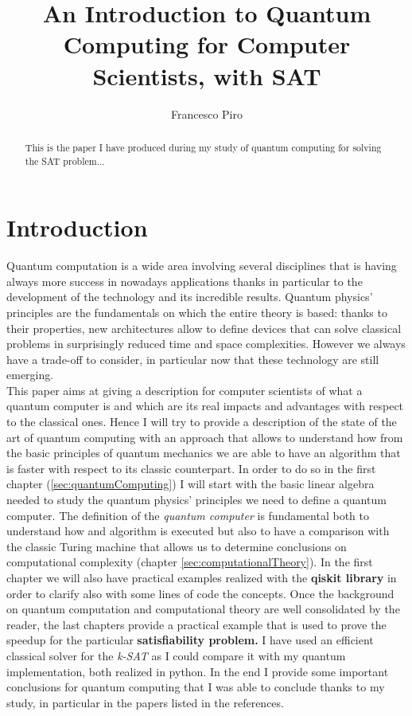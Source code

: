\documentclass[english]{article}
\begin{document}
	\title{An Introduction to Quantum Computing for Computer Scientists, with SAT}
	\author{Francesco Piro}
	\maketitle
	
	\begin{abstract}
		This is the paper I have produced during my study of quantum computing for solving the SAT problem...
	\end{abstract}

	
	\section*{Introduction}
	\label{sec:introduction}
	Quantum computation is a wide area involving several disciplines that is having always more success in nowadays applications thanks in particular to the development of the technology and its incredible results. Quantum physics' principles are the fundamentals on which the entire theory is based: thanks to their properties, new architectures allow to define devices that can solve classical problems in surprisingly reduced time and space complexities. However we always have a trade-off to consider, in particular now that these technology are still emerging.\\
	
	This paper aims at giving a description for computer scientists of what a quantum computer is and which are its real impacts and advantages with respect to the classical ones. Hence I will try to provide a description of the state of the art of quantum computing with an approach that allows to understand how from the basic principles of quantum mechanics we are able to have an algorithm that is faster with respect to its classic counterpart. In order to do so in the first chapter (\ref{sec:quantumComputing}) I will start with the basic linear algebra needed to study the quantum physics' principles we need to define a quantum computer. The definition of the \emph{quantum computer} is fundamental both to understand how and algorithm is executed but also to have a comparison with the classic Turing machine that allows us to determine conclusions on computational complexity (chapter \ref{sec:computationalTheory}). In the first chapter we will also have practical examples realized with the \textbf{qiskit library} in order to clarify also with some lines of code the concepts. Once the background on quantum computation and computational theory are well consolidated by the reader, the last chapters provide a practical example that is used to prove the speedup for the particular \textbf{satisfiability problem.} I have used an efficient classical solver for the \emph{k-SAT} as I could compare it with my quantum implementation, both realized in python. In the end I provide some important conclusions for quantum computing that I was able to conclude thanks to my study, in particular in the papers listed in the references.
	
\end{document}
